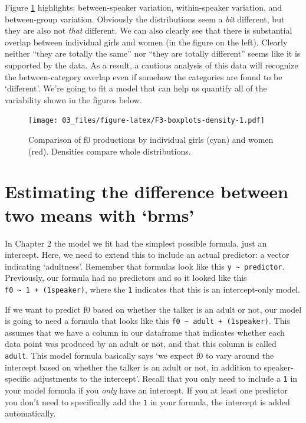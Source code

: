 \documentclass[
]{book}
\begin{document}
Figure \ref{fig:F3-boxplots-density} highlights: between-speaker variation, within-speaker variation, and between-group variation. Obviously the distributions seem a \emph{bit} different, but they are also not \emph{that} different. We can also clearly see that there is substantial overlap between individual girls and women (in the figure on the left). Clearly neither ``they are totally the same'' nor ``they are totally different'' seems like it is supported by the data. As a result, a cautious analysis of this data will recognize the between-category overlap even if somehow the categories are found to be `different'. We're going to fit a model that can help us quantify all of the variability shown in the figures below.

\begin{figure}
\centering
\texttt{[image: 03\_files/figure-latex/F3-boxplots-density-1.pdf]}
\caption{\label{fig:F3-boxplots-density}Comparison of f0 productions by individual girls (cyan) and women (red). Densities compare whole distributions.}
\end{figure}

\hypertarget{estimating-the-difference-between-two-means-with-brms}{%
\section{Estimating the difference between two means with `brms'}\label{estimating-the-difference-between-two-means-with-brms}}

In Chapter 2 the model we fit had the simplest possible formula, just an intercept. Here, we need to extend this to include an actual predictor: a vector indicating `adultness'. Remember that formulas look like this \texttt{y\ \textasciitilde{}\ predictor}. Previously, our formula had no predictors and so it looked like this \texttt{f0\ \textasciitilde{}\ 1\ +\ (1\textbar{}speaker)}, where the \texttt{1} indicates that this is an intercept-only model.

If we want to predict f0 based on whether the talker is an adult or not, our model is going to need a formula that looks like this \texttt{f0\ \textasciitilde{}\ adult\ +\ (1\textbar{}speaker)}. This assumes that we have a column in our dataframe that indicates whether each data point was produced by an adult or not, and that this column is called \texttt{adult}. This model formula basically says `we expect f0 to vary around the intercept based on whether the talker is an adult or not, in addition to speaker-specific adjustments to the intercept'. Recall that you only need to include a \texttt{1} in your model formula if you \emph{only} have an intercept. If you at least one predictor you don't need to specifically add the \texttt{1} in your formula, the intercept is added automatically.
\end{document}
